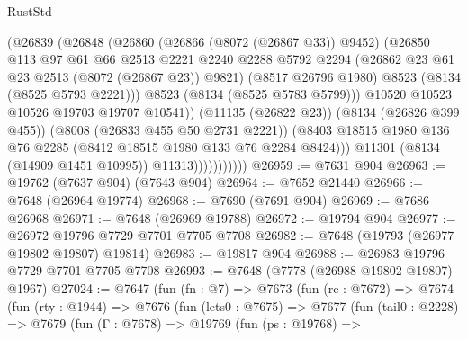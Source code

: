 \begin{lexlean}{RustStd}
\begin{coremodule}
{\begin{coremodule}
{{{{{{{{{{{{{{{{{{{{{{{{{{{{{{{{{{{{{{{{{{{{{{{{{{{{{                            (@26839
                              (@26848
                                (@26860
                                  (@26866 (@8072 (@26867 @33)) @9452)
                                  (@26850
                                    @113
                                    @97
                                    @61
                                    @66
                                    @2513
                                    @2221
                                    @2240
                                    @2288
                                    @5792
                                    @2294
                                    (@26862 @23 @61 @23 @2513 (@8072 (@26867 @23)) @9821)
                                    (@8517 @26796 @1980)
                                    @8523
                                    (@8134 (@8525 @5793 @2221)))
                                  @8523
                                  (@8134 (@8525 @5783 @5799)))
                                @10520
                                @10523
                                @10526
                                @19703
                                @19707
                                @10541))
                            (@11135 (@26822 @23))
                            (@8134 (@26826 @399 @455))
                            (@8008 (@26833 @455 @50 @2731 @2221))
                            (@8403
                              @18515
                              @1980
                              @136
                              @76
                              @2285
                              (@8412 @18515 @1980 @133 @76 @2284 @8424)))
                          @11301
                          (@8134 (@14909 @1451 @10995))
                          @11313)))))))))))
@26959 := @7631 @904
@26963 := @19762 (@7637 @904) (@7643 @904)
@26964 := @7652 @21440
@26966 := @7648 (@26964 @19774)
@26968 := @7690 (@7691 @904)
@26969 := @7686 @26968
@26971 := @7648 (@26969 @19788)
@26972 := @19794 @904
@26977 := @26972 @19796 @7729 @7701 @7705 @7708
@26982 := @7648 (@19793 (@26977 @19802 @19807) @19814)
@26983 := @19817 @904
@26988 := @26983 @19796 @7729 @7701 @7705 @7708
@26993 := @7648 (@7778 (@26988 @19802 @19807) @1967)
@27024 := @7647
    (fun (fn : @7) =>
    @7673
      (fun (rc : @7672) =>
      @7674
        (fun (rty : @1944) =>
        @7676
          (fun (lets0 : @7675) =>
          @7677
            (fun (tail0 : @2228) =>
            @7679
              (fun (Γ : @7678) =>
              @19769
                (fun (ps : @19768) =>
}}}}}}}}}}}}}}}}}}}}}}}}}}}}}}}}}}}}}}}}}}}}}}}}}}}}}
\end{coremodule}}
\end{coremodule}
\end{lexlean}
